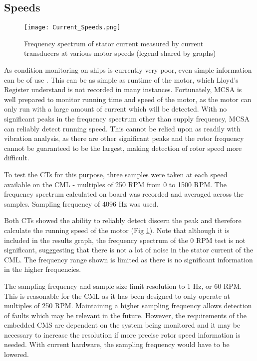 \subsection{Speeds}

\begin{figure}
    \centering
    \texttt{[image: Current\_Speeds.png]}
    \caption{Frequency spectrum of stator current measured by current transducers at various motor speeds (legend shared by graphs)}
    \label{fig:Current_Speeds}
\end{figure}

As condition monitoring on ships is currently very poor, even simple information can be of use \cite{CBM_lr}.
This can be as simple as runtime of the motor, which Lloyd's Register understand is not recorded in many instances.
Fortunately, MCSA is well prepared to monitor running time and speed of the motor, as the motor can only run with a large amount of current which will be detected.
With no significant peaks in the frequency spectrum other than supply frequency, MCSA can reliably detect running speed.
This cannot be relied upon as readily with vibration analysis, as there are other significant peaks and the rotor frequency cannot be guaranteed to be the largest, making detection of rotor speed more difficult.
\par

To test the CTs for this purpose, three samples were taken at each speed available on the CML - multiples of 250 RPM from 0 to 1500 RPM.
The frequency spectrum calculated on board was recorded and averaged across the samples.
Sampling frequency of 4096 Hz was used.
\par

Both CTs showed the ability to reliably detect discern the peak and therefore calculate the running speed of the motor (Fig \ref{fig:Current_Speeds}).
Note that although it is included in the results graph, the frequency spectrum of the 0 RPM test is not significant, sugggesting that there is not a lot of noise in the stator current of the CML.
The frequency range shown is limited as there is no significant information in the higher frequencies.
\par

The sampling frequency and sample size limit resolution to 1 Hz, or 60 RPM.
This is reasonable for the CML as it has been designed to only operate at multiples of 250 RPM.
Maintaining a higher sampling frequency allows detection of faults which may be relevant in the future.
However, the requirements of the embedded CMS are dependent on the system being monitored and it may be necessary to increase the resolution if more precise rotor speed information is needed.
With current hardware, the sampling frequency would have to be lowered.

